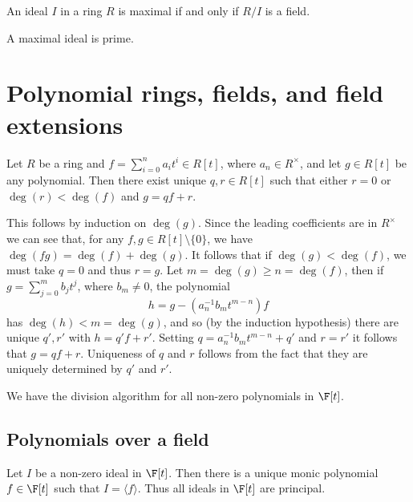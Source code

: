 \documentclass{maths}
\begin{document}
\begin{lem}
    An ideal $I$ in a ring $R$ is maximal if and only if $R/I$ is a field.
\end{lem}

\begin{cor}
    A maximal ideal is prime.
\end{cor}

\section{Polynomial rings, fields, and field extensions}

\begin{lem}
    Let $R$ be a ring and $f=\sum_{i=0}^n a_i t^i\in R[t]$, where $a_n\in R^{\times}$, and let $g\in R[t]$ be any polynomial.
    Then there exist unique $q,r\in R[t]$ such that either $r=0$ or $\deg(r)<\deg(f)$ and $g=qf+r$.
\end{lem}

\begin{prf}
    This follows by induction on $\deg(g)$.
    Since the leading coefficients are in $R^{\times}$ we can see that, for any $f,g\in R[t]\setminus\{0\}$, we have $\deg(fg)=\deg(f)+\deg(g)$.
    It follows that if $\deg(g)<\deg(f)$, we must take $q=0$ and thus $r=g$.
    Let $m=\deg(g)\geqslant n=\deg(f)$, then if $g=\sum_{j=0}^m b_j t^j$, where $b_m\neq0$, the polynomial
    \[
        h =
        g - (a_n^{-1} b_m t^{m-n})f
    \]
    has $\deg(h)<m=\deg(g)$, and so (by the induction hypothesis) there are unique $q',r'$ with $h=q'f+r'$.
    Setting $q=a_n^{-1} b_m t^{m-n}+q'$ and $r=r'$ it follows that $g=qf+r$.
    Uniqueness of $q$ and $r$ follows from the fact that they are uniquely determined by $q'$ and $r'$.
\end{prf}

\begin{cor}
    We have the division algorithm for all non-zero polynomials in $\F[t]$.
\end{cor}

\subsection{Polynomials over a field}

\begin{lem}
    Let $I$ be a non-zero ideal in $\F[t]$.
    Then there is a unique monic polynomial $f\in\F[t]$ such that $I=\langle f\rangle$.
    Thus all ideals in $\F[t]$ are principal.
\end{lem}
\end{document}
